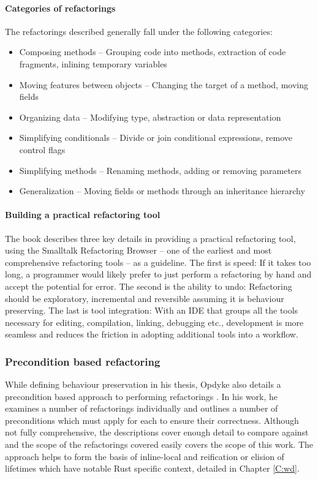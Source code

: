 \paragraph{Categories of refactorings}
The refactorings described generally fall under the following categories:
\begin{itemize}
\item Composing methods -- Grouping code into methods, extraction of code fragments, inlining temporary variables
\item Moving features between objects -- Changing the target of a method, moving fields
\item Organizing data -- Modifying type, abstraction or data representation
\item Simplifying conditionals -- Divide or join conditional expressions, remove control flags
\item Simplifying methods -- Renaming methods, adding or removing parameters
\item Generalization -- Moving fields or methods through an inheritance hierarchy
\end{itemize}

\paragraph{Building a practical refactoring tool}
The book describes three key details in providing a practical refactoring tool, using the Smalltalk Refactoring Browser -- one of the earliest and most comprehensive refactoring tools -- as a guideline. The first is speed: If it takes too long, a programmer would likely prefer to just perform a refactoring by hand and accept the potential for error. The second is the ability to undo: Refactoring should be exploratory, incremental and reversible assuming it is behaviour preserving. The last is tool integration: With an IDE that groups all the tools necessary for editing, compilation, linking, debugging etc., development is more seamless and reduces the friction in adopting additional tools into a workflow. 




\subsubsection{Precondition based refactoring}
While defining behaviour preservation in his thesis, Opdyke also details a precondition based approach to performing refactorings \cite{opdyke1992refactoring}. In his work, he examines a number of refactorings individually and outlines a number of preconditions which must apply for each to ensure their correctness. Although not fully comprehensive, the descriptions cover enough detail to compare against and the scope of the refactorings covered easily covers the scope of this work. The approach helps to form the basis of inline-local and reification or elision of lifetimes which have notable Rust specific context, detailed in Chapter \ref{C:wd}. 

